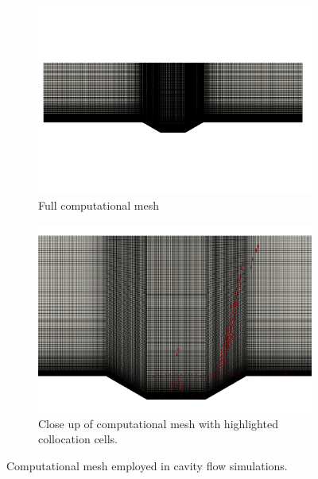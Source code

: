 \begin{figure}
\begin{center}
\begin{subfigure}[t]{0.49\textwidth}
\includegraphics[trim={2cm 2cm 4cm 2cm},clip,width=1.\linewidth]{figs/cavity_new/grid.png}
\caption{Full computational mesh}
\end{subfigure}
\begin{subfigure}[t]{0.49\textwidth}
\includegraphics[trim={0cm 0cm 0cm 0cm},clip,width=1.0\linewidth]{figs/cavity_new/sampleMesh.png}
\caption{Close up of computational mesh with highlighted collocation cells.} 
\label{fig:cav_sampmesh}
\end{subfigure}
\caption{Computational mesh employed in cavity flow simulations.}
\label{fig:cav_mesh}
\end{center}
\end{figure}

